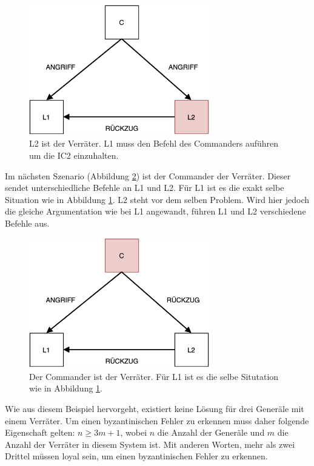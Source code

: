 \documentclass{article}
\begin{document}
\begin{figure}[H]
    \centering
    \includegraphics[width=0.7\textwidth]{general1.png}
    \caption{L2 ist der Verräter. L1 muss den Befehl des Commanders auführen um die IC2 einzuhalten.}
    \label{fig:general1}
\end{figure}

Im nächsten Szenario (Abbildung \ref{fig:general2}) ist der Commander der Verräter. Dieser sendet unterschiedliche 
Befehle an L1 und L2. Für L1 ist es die exakt selbe Situation 
wie in Abbildung \ref{fig:general1}. L2 steht vor dem selben Problem. 
Wird hier jedoch die gleiche Argumentation wie bei L1 angewandt, führen L1 und L2 verschiedene Befehle aus. 

\begin{figure}[H]
    \centering
    \includegraphics[width=0.7\textwidth]{general2.png}
    \caption{Der Commander ist der Verräter. Für L1 ist es die selbe Situtation wie in Abbildung \ref{fig:general1}.}
    \label{fig:general2}
\end{figure}

Wie aus diesem Beispiel hervorgeht, existiert keine Lösung für drei Generäle mit einem Verräter. 
Um einen byzantinischen Fehler zu erkennen muss daher folgende Eigenschaft gelten: $n \geq 3m + 1$, 
wobei $n$ die Anzahl der Generäle und $m$ die Anzahl der Verräter in diesem System ist. Mit anderen Worten, 
mehr als zwei Drittel müssen loyal sein, um einen byzantinischen Fehler zu erkennen. 
\end{document}
